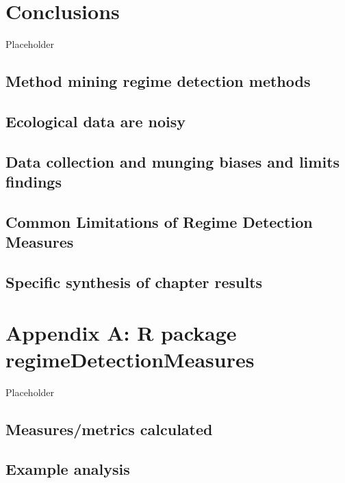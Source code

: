 \documentclass[12pt,twoside,openany]{reedthesis}
\begin{document}
\chapter{Conclusions}\label{conclusions}

Placeholder

\section{Method mining regime detection
methods}\label{method-mining-regime-detection-methods}

\section{Ecological data are noisy}\label{ecological-data-are-noisy}

\section{Data collection and munging biases and limits
findings}\label{data-collection-and-munging-biases-and-limits-findings}

\section{Common Limitations of Regime Detection
Measures}\label{common-limitations-of-regime-detection-measures}

\section{Specific synthesis of chapter
results}\label{specific-synthesis-of-chapter-results}

\chapter*{Appendix A: R package
regimeDetectionMeasures}\label{regimeDetectionMeasures}

Placeholder

\section{Measures/metrics calculated}\label{measuresmetrics-calculated}

\section{Example analysis}\label{example-analysis}
\end{document}
